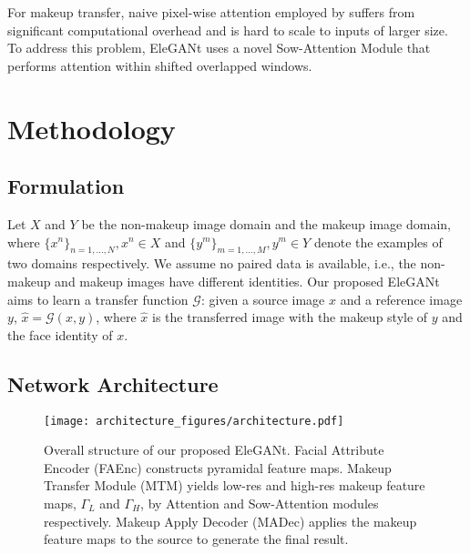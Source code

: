 For makeup transfer, naive pixel-wise attention employed by \cite{PSGAN,FAT} suffers from significant computational overhead and is hard to scale to inputs of larger size. To address this problem, EleGANt uses a novel Sow-Attention Module that performs attention within shifted overlapped windows. 

\section{Methodology}
\subsection{Formulation}
Let $X$ and $Y$ be the non-makeup image domain and the
makeup image domain, where $\{x^n\}_{n=1,\dots,N},x^n\in X$ and $\{y^m\}_{m=1,\dots,M},y^m\in Y$ denote the examples of two domains respectively. We assume no paired data is available, i.e., the non-makeup and makeup images have different identities. Our proposed EleGANt aims to learn a transfer function $\mathcal{G}$: given a source image $x$ and a reference image $y$, $\hat{x}=\mathcal{G}(x,y)$, where $\hat{x}$ is the transferred image with the makeup style of $y$ and the face identity of $x$.  

\subsection{Network Architecture}
\label{sec:arch}
\begin{figure}[t]
    \setlength{\belowcaptionskip}{-0.2cm} 
    \centering
    \texttt{[image: architecture\_figures/architecture.pdf]}
\caption{Overall structure of our proposed EleGANt. Facial Attribute Encoder (FAEnc) constructs pyramidal feature maps. Makeup Transfer Module (MTM) yields low-res and high-res makeup feature maps, $\Gamma_L$ and $\Gamma_H$, by Attention and Sow-Attention modules respectively. Makeup Apply Decoder (MADec) applies the makeup feature maps to the source to generate the final result.}
    \label{fig-arch}
\end{figure}
